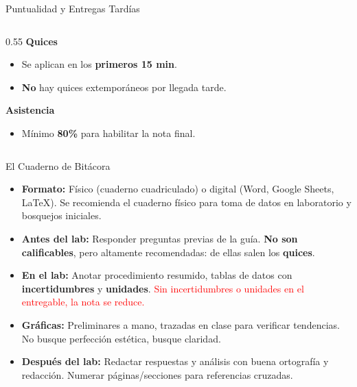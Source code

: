 \documentclass[aspectratio=169,xcolor=dvipsnames]{beamer}
\begin{document}
\begin{frame}{Puntualidad y Entregas Tardías}
	\vspace{-0.2cm}
	\begin{columns}[T]
		\begin{column}{0.55\textwidth}
			\textbf{Quices}
			\vspace{0.1cm}
			
			\small
			\begin{itemize}
				\item Se aplican en los \textbf{primeros 15 min}.
				\vspace{0.15cm}
				\item \textbf{No} hay quices extemporáneos por llegada tarde.
			\end{itemize}
			
			\vspace{0.3cm}
			\textbf{Asistencia}
			\vspace{0.1cm}
			
			\small
			\begin{itemize}
				\item Mínimo \textbf{80\%} para habilitar la nota final.
			\end{itemize}
		\end{column}
		
	\end{columns}
\end{frame}

\begin{frame}{El Cuaderno de Bitácora}
	\vspace{-0.3cm}
	\small
	\begin{itemize}
		\item \textbf{Formato:} Físico (cuaderno cuadriculado) o digital (Word, Google Sheets, \LaTeX). 
		Se recomienda el cuaderno físico para toma de datos en laboratorio y bosquejos iniciales.
		\vspace{0.08cm}
		\item \textbf{Antes del lab:} Responder preguntas previas de la guía. \textbf{No son calificables}, pero altamente recomendadas: de ellas salen los \textbf{quices}.
		\vspace{0.08cm}
		\item \textbf{En el lab:} Anotar procedimiento resumido, tablas de datos con \textbf{incertidumbres} y \textbf{unidades}. 
		\textcolor{red}{Sin incertidumbres o unidades en el entregable, la nota se reduce.}
		\vspace{0.08cm}
		\item \textbf{Gráficas:} Preliminares a mano, trazadas en clase para verificar tendencias. No busque perfección estética, busque claridad.
		\vspace{0.08cm}
		\item \textbf{Después del lab:} Redactar respuestas y análisis con buena ortografía y redacción. Numerar páginas/secciones para referencias cruzadas.
	\end{itemize}
\end{frame}
\end{document}
